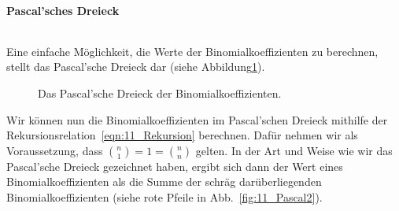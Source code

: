 \paragraph{Pascal'sches Dreieck}$~$

Eine einfache Möglichkeit, die Werte der Binomialkoeffizienten zu berechnen, stellt das Pascal'sche Dreieck dar (siehe Abbildung\ref{fig:11_Pascal1}). 
\begin{figure}[htp]
    \centering
    \caption{Das Pascal'sche Dreieck der Binomialkoeffizienten.}
    \label{fig:11_Pascal1}
\end{figure}

Wir können nun die Binomialkoeffizienten im Pascal'schen Dreieck mithilfe der Rekursionsrelation~\eqref{eqn:11_Rekursion} berechnen. Dafür nehmen wir als Voraussetzung, dass $\binom{n}{1} = 1 = \binom{n}{n}$ gelten. In der Art und Weise wie wir das Pascal'sche Dreieck gezeichnet haben, ergibt sich dann der Wert eines Binomialkoeffizienten als die Summe der schräg darüberliegenden Binomialkoeffizienten (siehe rote Pfeile in Abb.~\ref{fig:11_Pascal2}).

